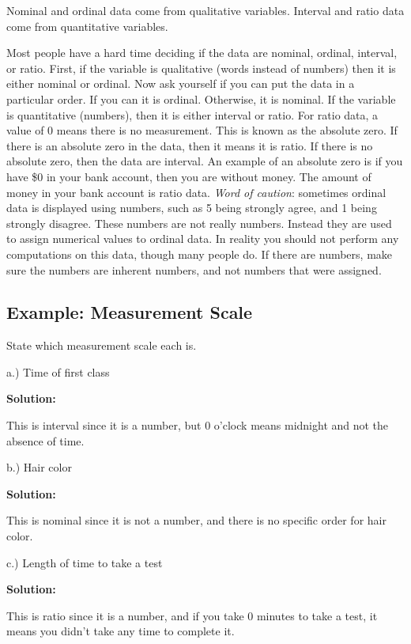 \documentclass[
]{book}
\begin{document}
Nominal and ordinal data come from qualitative variables. Interval and ratio data come from quantitative variables.

Most people have a hard time deciding if the data are nominal, ordinal, interval, or ratio. First, if the variable is qualitative (words instead of numbers) then it is either nominal or ordinal. Now ask yourself if you can put the data in a particular order. If you can it is ordinal. Otherwise, it is nominal. If the variable is quantitative (numbers), then it is either interval or ratio. For ratio data, a value of 0 means there is no measurement. This is known as the absolute zero. If there is an absolute zero in the data, then it means it is ratio. If there is no absolute zero, then the data are interval. An example of an absolute zero is if you have \$0 in your bank account, then you are without money. The amount of money in your bank account is ratio data. \emph{Word of caution}: sometimes ordinal data is displayed using numbers, such as 5 being strongly agree, and 1 being strongly disagree. These numbers are not really numbers. Instead they are used to assign numerical values to ordinal data. In reality you should not perform any computations on this data, though many people do. If there are numbers, make sure the numbers are inherent numbers, and not numbers that were assigned.

\hypertarget{example-measurement-scale}{%
\subsection{Example: Measurement Scale}\label{example-measurement-scale}}

State which measurement scale each is.

a.) Time of first class

\textbf{Solution:}

This is interval since it is a number, but 0 o'clock means midnight and not the absence of time.

b.) Hair color

\textbf{Solution:}

This is nominal since it is not a number, and there is no specific order for hair color.

c.) Length of time to take a test

\textbf{Solution:}

This is ratio since it is a number, and if you take 0 minutes to take a test, it means you didn't take any time to complete it.
\end{document}

